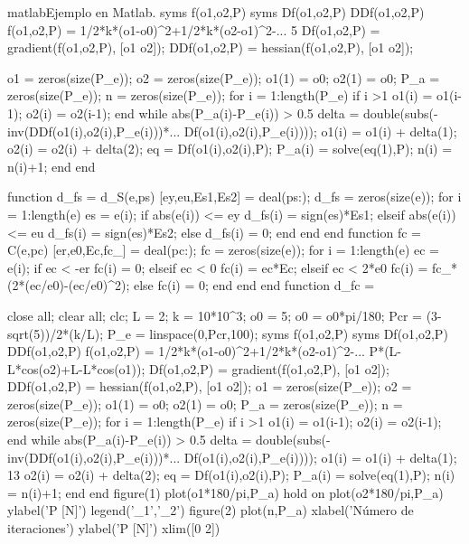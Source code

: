 \begin{sourcecode}{matlab}{Ejemplo en Matlab.}
syms f(o1,o2,P)
syms Df(o1,o2,P) DDf(o1,o2,P)
f(o1,o2,P) = 1/2*k*(o1-o0)^2+1/2*k*(o2-o1)^2-...
5
Df(o1,o2,P) = gradient(f(o1,o2,P), [o1 o2]);
DDf(o1,o2,P) = hessian(f(o1,o2,P), [o1 o2]);

o1 = zeros(size(P_e)); %
o2 = zeros(size(P_e)); %
o1(1) = o0;
o2(1) = o0;
P_a = zeros(size(P_e)); %
n = zeros(size(P_e)); %
for i = 1:length(P_e)
if i >1
o1(i) = o1(i-1);
o2(i) = o2(i-1);
end
while abs(P_a(i)-P_e(i)) > 0.5
delta = double(subs(-inv(DDf(o1(i),o2(i),P_e(i)))*...
Df(o1(i),o2(i),P_e(i))));
o1(i) = o1(i) + delta(1);
o2(i) = o2(i) + delta(2);
eq = Df(o1(i),o2(i),P);
P_a(i) = solve(eq(1),P);
n(i) = n(i)+1;
end
end

function d_fs = d_S(e,ps)
[ey,eu,Es1,Es2] = deal(ps{:});
d_fs = zeros(size(e));
for i = 1:length(e)
es = e(i);
if abs(e(i)) <= ey
d_fs(i) = sign(es)*Es1;
elseif abs(e(i)) <= eu
d_fs(i) = sign(es)*Es2;
else
d_fs(i) = 0;
end
end
end
function fc = C(e,pc)
[er,e0,Ec,fc_] = deal(pc{:});
fc = zeros(size(e));
for i = 1:length(e)
ec = e(i);
if ec < -er
fc(i) = 0;
elseif ec < 0
fc(i) = ec*Ec;
elseif ec < 2*e0
fc(i) = fc_*(2*(ec/e0)-(ec/e0)^2);
else
fc(i) = 0;
end
end
end
function d_fc =

close all; clear all; clc;
L = 2; %
k = 10*10^3; %
o0 = 5; %
o0 = o0*pi/180; %
Pcr = (3-sqrt(5))/2*(k/L); %
P_e = linspace(0,Pcr,100); %
syms f(o1,o2,P)
syms Df(o1,o2,P) DDf(o1,o2,P)
f(o1,o2,P) = 1/2*k*(o1-o0)^2+1/2*k*(o2-o1)^2-...
P*(L-L*cos(o2)+L-L*cos(o1));
Df(o1,o2,P) = gradient(f(o1,o2,P), [o1 o2]);
DDf(o1,o2,P) = hessian(f(o1,o2,P), [o1 o2]);
o1 = zeros(size(P_e)); %
o2 = zeros(size(P_e)); %
o1(1) = o0;
o2(1) = o0;
P_a = zeros(size(P_e)); %
n = zeros(size(P_e)); %
for i = 1:length(P_e)
if i >1
o1(i) = o1(i-1);
o2(i) = o2(i-1);
end
while abs(P_a(i)-P_e(i)) > 0.5
delta = double(subs(-inv(DDf(o1(i),o2(i),P_e(i)))*...
Df(o1(i),o2(i),P_e(i))));
o1(i) = o1(i) + delta(1);
13
o2(i) = o2(i) + delta(2);
eq = Df(o1(i),o2(i),P);
P_a(i) = solve(eq(1),P);
n(i) = n(i)+1;
end
end
figure(1)
plot(o1*180/pi,P_a)
hold on
plot(o2*180/pi,P_a)
ylabel('P [N]')
legend('\theta_1','\theta_2')
figure(2)
plot(n,P_a)
xlabel('Número de iteraciones')
ylabel('P [N]')
xlim([0 2])
\end{sourcecode}